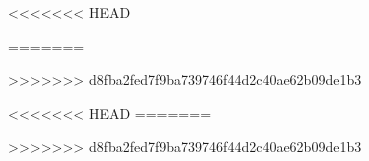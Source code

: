 




<<<<<<< HEAD

=======

>>>>>>> d8fba2fed7f9ba739746f44d2c40ae62b09de1b3







<<<<<<< HEAD
%
=======

>>>>>>> d8fba2fed7f9ba739746f44d2c40ae62b09de1b3






